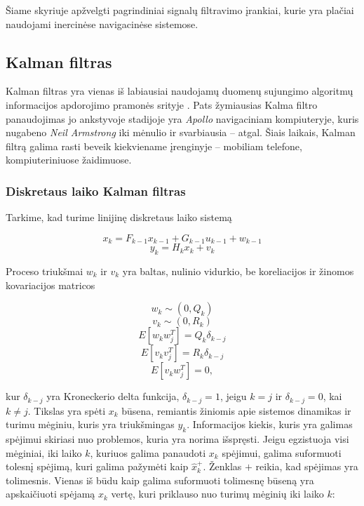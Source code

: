 Šiame skyriuje apžvelgti pagrindiniai signalų filtravimo įrankiai, kurie yra plačiai naudojami inercinėse navigacinėse sistemose.

\subsection{Kalman filtras}

    Kalman filtras \cite{kalman1960new} yra vienas iš labiausiai naudojamų duomenų sujungimo algoritmų informacijos apdorojimo pramonės srityje \cite{faragher2012understanding}. Pats žymiausias Kalma filtro panaudojimas jo ankstyvoje stadijoje yra \textit{Apollo} navigaciniam kompiuteryje, kuris nugabeno \textit{Neil Armstrong} iki mėnulio ir svarbiausia -- atgal. Šiais laikais, Kalman filtrą galima rasti beveik kiekviename įrenginyje -- mobiliam telefone, kompiuteriniuose žaidimuose.

    \subsubsection{Diskretaus laiko Kalman filtras}

    Tarkime, kad turime linijinę diskretaus laiko sistemą

    \begin{equation}
        x_k = F_{k-1}x_{k-1} + G_{k-1}u_{k-1} + w_{k-1}
    \end{equation}
    \begin{equation}
        y_k = H_k x_k + v_k
    \end{equation}

    Proceso triukšmai ${w_k}$ ir ${v_k}$ yra baltas, nulinio vidurkio, be koreliacijos ir žinomos kovariacijos matricos

    \begin{equation}
    w_k \sim (0, Q_k)
    \end{equation}
    \begin{equation}
    v_k \sim (0, R_k)
    \end{equation}
    \begin{equation}
    E[w_k w_j^T] = Q_k \delta_{k-j}
    \end{equation}
    \begin{equation}
    E[v_k v_j^T] = R_k\delta_{k-j}
    \end{equation}
    \begin{equation}
    E[v_k w_j^T] = 0,
    \end{equation}

    kur $\delta_{k-j}$ yra Kroneckerio delta funkcija, $\delta_{k-j} = 1$, jeigu $k=j$ ir $\delta_{k-j} = 0$, kai $k \neq j$.
    Tikslas yra spėti $x_k$ būsena, remiantis žiniomis apie sistemos dinamikas ir turimu mėginiu, kuris yra triukšmingas ${y_k}$.
    Informacijos kiekis, kuris yra galimas spėjimui skiriasi nuo problemos, kuria yra norima išspręsti.
    Jeigu egzistuoja visi mėginiai, iki laiko $k$, kuriuos galima panaudoti $x_k$ spėjimui, galima suformuoti tolesnį spėjimą, kuri galima pažymėti kaip $\hat{x}_k^{+}$.
    Ženklas $+$ reikia, kad spėjimas yra tolimesnis.
    Vienas iš būdu kaip galima suformuoti tolimesnę būseną yra apskaičiuoti spėjamą $x_k$ vertę, kuri priklauso nuo turimų mėginių iki laiko $k$:

